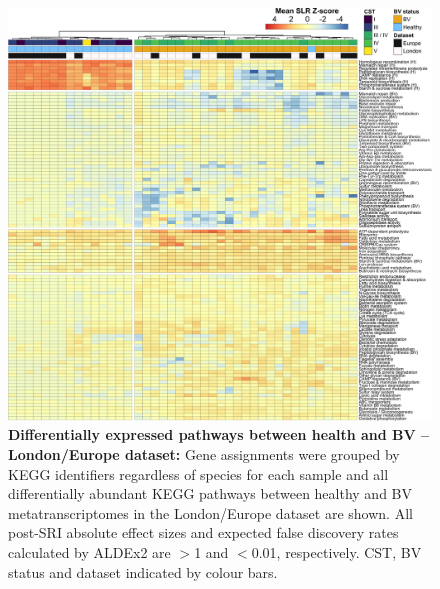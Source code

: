 \documentclass[sn-mathphys,Numbered]{sn-jnl}%
\begin{document}
\begin{figure}[H]
    \centering
    \includegraphics[scale = 0.8125]{0_supplFig1.png}
    \caption{\textbf{Differentially expressed pathways between health and BV --London/Europe dataset:} Gene assignments were grouped by KEGG identifiers regardless of species for each sample and all differentially abundant KEGG pathways between healthy and BV metatranscriptomes in the London/Europe dataset are shown. All post-SRI absolute effect sizes and expected false discovery rates calculated by ALDEx2 are $>$1 and $<$0.01, respectively. CST, BV status and dataset indicated by colour bars.} \label{fig:sfigDifAbLonEurAll}
\end{figure}
\newpage
\end{document}
